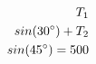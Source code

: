 \documentclass[preview]{standalone}
\begin{document}
\begin{align*}
\special{dvisvgm:raw <g id='unique000'>}T_1 \\sin(30^{\circ}) + T_2 \\sin(45^{\circ}) = 500\special{dvisvgm:raw </g>}
\end{align*}
\end{document}
